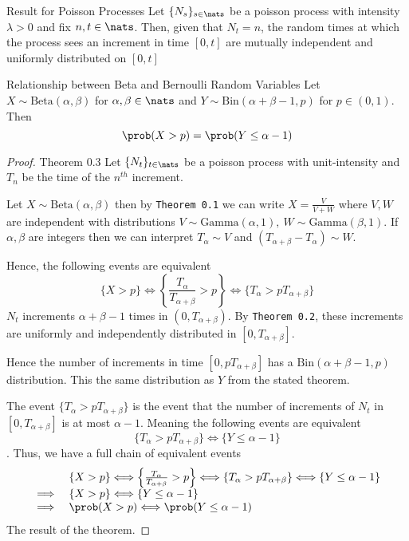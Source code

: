 \documentclass[11pt,a4paper]{article}
\begin{document}
  \begin{theorem}{Result for Poisson Processes}
    Let $\{N_s\}_{s\in\nats}$ be a poisson process with intensity $\lambda>0$ and fix $n,t\in\nats$. Then, given that $N_t=n$, the random times at which the process sees an increment in time $[0,t]$ are mutually independent and uniformly distributed on $[0,t]$
  \end{theorem}

  \begin{theorem}{Relationship between Beta and Bernoulli Random Variables}
    Let $X\sim\text{Beta}(\alpha,\beta)$ for $\alpha,\beta\in\nats$ and $Y\sim\text{Bin}(\alpha+\beta-1,p)$ for $p\in(0,1)$. Then
    \[ \prob(X>p)=\prob(Y\leq\alpha-1) \]
  \end{theorem}

  \begin{proof}{Theorem 0.3}
    Let $\{N_t\}_{t\in\nats}$ be a poisson process with unit-intensity and $T_n$ be the time of the $n^{th}$ increment.
    \par Let $X\sim\text{Beta}(\alpha,\beta)$ then by \texttt{Theorem 0.1} we can write $X=\frac{V}{V+W}$ where $V,W$ are independent with distributions $V\sim\text{Gamma}(\alpha,1),\ W\sim\text{Gamma}(\beta,1)$. If $\alpha,\beta$ are integers then we can interpret $T_\alpha\sim V$ and $(T_{\alpha+\beta}-T_\alpha)\sim W$.
    \par Hence, the following events are equivalent
    \[ \{X>p\}\Longleftrightarrow\left\{\frac{T_\alpha}{T_{\alpha+\beta}}>p\right\}\Longleftrightarrow\{T_\alpha>pT_{\alpha+\beta}\} \]
    $N_t$ increments $\alpha+\beta-1$ times in $(0,T_{\alpha+\beta})$. By \texttt{Theorem 0.2}, these increments are uniformly and independently distributed in $[0,T_{\alpha+\beta}]$.
    \par Hence the number of increments in time $[0,pT_{\alpha+\beta}]$ has a $\text{Bin}(\alpha+\beta-1,p)$ distribution. This the same distribution as $Y$ from the stated theorem.
    \par The event $\{T_\alpha>pT_{\alpha+\beta}\}$ is the event that the number of increments of $N_t$ in $[0,T_{\alpha+\beta}]$ is at most $\alpha-1$. Meaning the following events are equivalent
    \[ \{T_\alpha>pT_{\alpha+\beta}\}\Longleftrightarrow\{Y\leq \alpha-1\} \].
    Thus, we have a full chain of equivalent events
    \[\begin{array}{rl}
    &\{X>p\}\Longleftrightarrow\left\{\frac{T_\alpha}{T_{\alpha+\beta}}>p\right\}\Longleftrightarrow\{T_\alpha>pT_{\alpha+\beta}\}\Longleftrightarrow\{Y\leq \alpha-1\}\\
    \implies&\{X>p\}\Longleftrightarrow\{Y\leq \alpha-1\}\\
    \implies&\prob(X>p)\Longleftrightarrow\prob(Y\leq\alpha-1)
    \end{array}\]
    The result of the theorem.
    \proved
  \end{proof}
\end{document}
